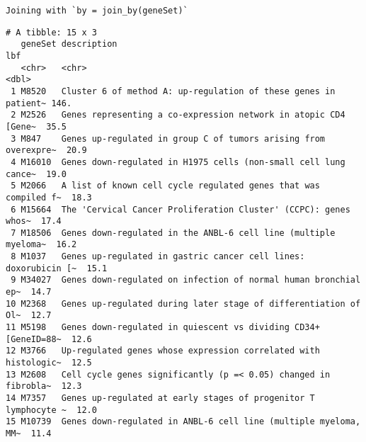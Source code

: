 \documentclass[
  letterpaper,
  DIV=11,
  numbers=noendperiod]{scrreprt}
\newenvironment{Shaded}{\begin{snugshade}}{\end{snugshade}}
\newcommand{\AttributeTok}[1]{\textcolor[rgb]{0.40,0.45,0.13}{#1}}
\newcommand{\DecValTok}[1]{\textcolor[rgb]{0.68,0.00,0.00}{#1}}
\newcommand{\FunctionTok}[1]{\textcolor[rgb]{0.28,0.35,0.67}{#1}}
\newcommand{\NormalTok}[1]{\textcolor[rgb]{0.00,0.23,0.31}{#1}}
\newcommand{\SpecialCharTok}[1]{\textcolor[rgb]{0.37,0.37,0.37}{#1}}
\begin{document}
\begin{Shaded}
\end{Shaded}

\begin{verbatim}
Joining with `by = join_by(geneSet)`
\end{verbatim}

\begin{verbatim}
# A tibble: 15 x 3
   geneSet description                                                       lbf
   <chr>   <chr>                                                           <dbl>
 1 M8520   Cluster 6 of method A: up-regulation of these genes in patient~ 146. 
 2 M2526   Genes representing a co-expression network in atopic CD4 [Gene~  35.5
 3 M847    Genes up-regulated in group C of tumors arising from overexpre~  20.9
 4 M16010  Genes down-regulated in H1975 cells (non-small cell lung cance~  19.0
 5 M2066   A list of known cell cycle regulated genes that was compiled f~  18.3
 6 M15664  The 'Cervical Cancer Proliferation Cluster' (CCPC): genes whos~  17.4
 7 M18506  Genes down-regulated in the ANBL-6 cell line (multiple myeloma~  16.2
 8 M1037   Genes up-regulated in gastric cancer cell lines: doxorubicin [~  15.1
 9 M34027  Genes down-regulated on infection of normal human bronchial ep~  14.7
10 M2368   Genes up-regulated during later stage of differentiation of Ol~  12.7
11 M5198   Genes down-regulated in quiescent vs dividing CD34+ [GeneID=88~  12.6
12 M3766   Up-regulated genes whose expression correlated with histologic~  12.5
13 M2608   Cell cycle genes significantly (p =< 0.05) changed in fibrobla~  12.3
14 M7357   Genes up-regulated at early stages of progenitor T lymphocyte ~  12.0
15 M10739  Genes down-regulated in ANBL-6 cell line (multiple myeloma, MM~  11.4
\end{verbatim}
\end{document}
